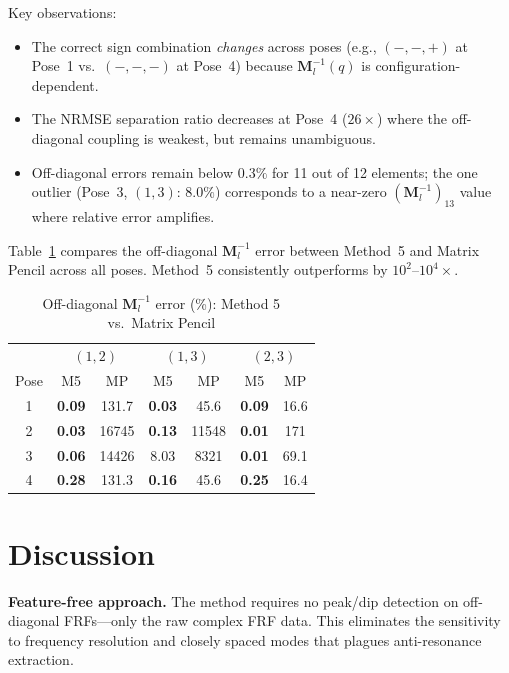 \documentclass[10pt,twocolumn]{article}
\begin{document}
Key observations:
\begin{itemize}
\item The correct sign combination \emph{changes} across poses (e.g., $(-,-,+)$ at Pose~1 vs.\ $(-,-,-)$ at Pose~4) because $\bm{M}_l^{-1}(q)$ is configuration-dependent.
\item The NRMSE separation ratio decreases at Pose~4 ($26\times$) where the off-diagonal coupling is weakest, but remains unambiguous.
\item Off-diagonal errors remain below $0.3\%$ for 11 out of 12 elements; the one outlier (Pose~3, $(1,3)$: $8.0\%$) corresponds to a near-zero $(\bm{M}_l^{-1})_{13}$ value where relative error amplifies.
\end{itemize}

Table~\ref{tab:multipose_err} compares the off-diagonal $\bm{M}_l^{-1}$ error between Method~5 and Matrix Pencil across all poses. Method~5 consistently outperforms by $10^2$--$10^4\times$.

\begin{table}[ht]
\centering
\caption{Off-diagonal $\bm{M}_l^{-1}$ error (\%): Method 5 vs.\ Matrix Pencil}
\label{tab:multipose_err}
\begin{tabular}{ccccccc}
\toprule
& \multicolumn{2}{c}{$(1,2)$} & \multicolumn{2}{c}{$(1,3)$} & \multicolumn{2}{c}{$(2,3)$} \\
Pose & M5 & MP & M5 & MP & M5 & MP \\
\midrule
1 & \textbf{0.09} & 131.7 & \textbf{0.03} & 45.6 & \textbf{0.09} & 16.6 \\
2 & \textbf{0.03} & 16745 & \textbf{0.13} & 11548 & \textbf{0.01} & 171 \\
3 & \textbf{0.06} & 14426 & 8.03 & 8321 & \textbf{0.01} & 69.1 \\
4 & \textbf{0.28} & 131.3 & \textbf{0.16} & 45.6 & \textbf{0.25} & 16.4 \\
\bottomrule
\end{tabular}
\end{table}

\section{Discussion}

\textbf{Feature-free approach.} The method requires no peak/dip detection on off-diagonal FRFs---only the raw complex FRF data. This eliminates the sensitivity to frequency resolution and closely spaced modes that plagues anti-resonance extraction.
\end{document}
